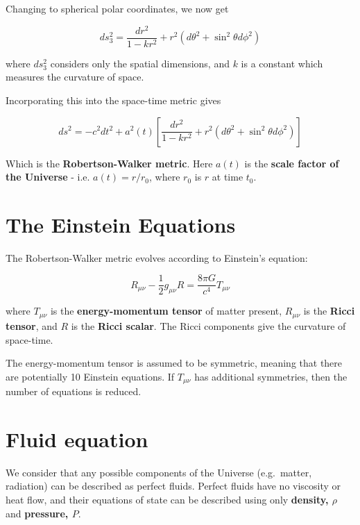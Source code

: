 \documentclass[]{book}
\begin{document}
Changing to spherical polar coordinates, we now get

\begin{equation}
ds^2_3 = \dfrac{dr^2}{1 - kr^2} + r^2\left(d\theta^2 + \sin^2\theta d\phi^2\right)
\label{eq:ds-gr-metric-polar}
\end{equation}

where \(ds_3^2\) considers only the spatial dimensions, and \(k\) is a
constant which measures the curvature of space.

Incorporating this into the space-time metric gives

\begin{equation}
ds^2 = -c^2 dt^2 + a^2(t) \left[\dfrac{dr^2}{1 - kr^2} + r^2\left(d\theta^2 + \sin^2\theta d\phi^2\right)\right]
\label{eq:rw-metric}
\end{equation}

Which is the \textbf{Robertson-Walker metric}. Here \(a(t)\) is the
\textbf{scale factor of the Universe} - i.e. \(a(t) = r/r_0\), where
\(r_0\) is \(r\) at time \(t_0\).

\section{The Einstein Equations}\label{sec:einstein_eqs}

The Robertson-Walker metric evolves according to Einstein's equation:

\begin{equation}
R_{\mu\nu} - \dfrac{1}{2}g_{\mu\nu}R = \dfrac{8\pi G}{c^4} T_{\mu\nu}
\label{eq:einstein}
\end{equation}

where \({T_{\mu\nu}}\) is the \textbf{energy-momentum tensor} of matter
present, \({R_{\mu\nu}}\) is the \textbf{Ricci tensor}, and \({R}\) is
the \textbf{Ricci scalar}. The Ricci components give the curvature of
space-time.

The energy-momentum tensor is assumed to be symmetric, meaning that
there are potentially 10 Einstein equations. If \(T_{\mu\nu}\) has
additional symmetries, then the number of equations is reduced.

\hypertarget{sec:fluid_eqns}{\section{Fluid
equation}\label{sec:fluid_eqns}}

We consider that any possible components of the Universe (e.g.~matter,
radiation) can be described as perfect fluids. Perfect fluids have no
viscosity or heat flow, and their equations of state can be described
using only \textbf{density, \(\rho\)} and \textbf{pressure, \(P\)}.
\end{document}
